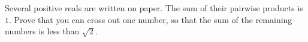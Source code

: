 Several positive reals are written on paper. The sum of their pairwise products is $1$. Prove that you can cross out one number, so that the sum of the remaining numbers is less than $\sqrt{2}$.
